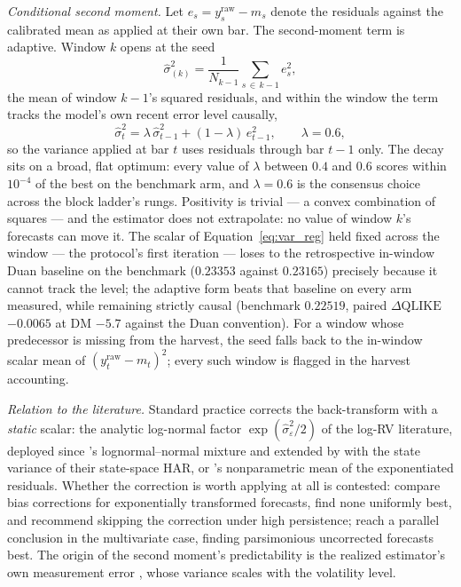 \emph{Conditional second moment.} Let
$e_s = y^{\mathrm{raw}}_s - m_s$ denote the residuals against the
calibrated mean as applied at their own bar. The second-moment term is
adaptive. Window $k$ opens at the seed
\begin{equation}
    \hat{\sigma}^2_{(k)}
    = \frac{1}{N_{k-1}} \sum_{s \,\in\, k-1} e_s^2,
    \label{eq:var_reg}
\end{equation}
the mean of window $k-1$'s squared residuals, and within the window the
term tracks the model's own recent error level causally,
\begin{equation}
    \hat{\sigma}^2_t
    = \lambda\, \hat{\sigma}^2_{t-1} + (1 - \lambda)\, e_{t-1}^2,
    \qquad \lambda = 0.6,
    \label{eq:var_ewma}
\end{equation}
so the variance applied at bar $t$ uses residuals through bar $t-1$
only. The decay sits on a broad, flat optimum: every value of $\lambda$
between $0.4$ and $0.6$ scores within $10^{-4}$ of the best on the
benchmark arm, and $\lambda = 0.6$ is the consensus choice across the
block ladder's rungs. Positivity is trivial --- a convex combination of
squares --- and the estimator does not extrapolate: no value of window
$k$'s forecasts can move it. The scalar of
Equation~\eqref{eq:var_reg} held fixed across the window --- the protocol's first iteration --- loses to the retrospective in-window Duan
baseline on the benchmark ($0.23353$ against $0.23165$) precisely
because it cannot track the level; the adaptive form beats that
baseline on every arm measured, while remaining strictly causal
(benchmark $0.22519$, paired $\Delta\mathrm{QLIKE}$ $-0.0065$ at DM
$-5.7$ against the Duan convention). For a window whose predecessor is
missing from the harvest, the seed falls back to the in-window scalar
mean of $(y^{\mathrm{raw}}_t - m_t)^2$; every such window is flagged in
the harvest accounting.

\emph{Relation to the literature.} Standard practice corrects the
back-transform with a \emph{static} scalar: the analytic log-normal
factor $\exp(\hat\sigma^2_\varepsilon / 2)$ of the log-RV literature,
deployed since \citet{AndersenBollerslevDieboldLabys2003}'s
lognormal--normal mixture and extended by \citet{BekiermanManner2018}
with the state variance of their state-space HAR, or
\citet{Duan1983}'s nonparametric mean of the exponentiated residuals.
Whether the correction is worth applying at all is contested:
\citet{DemetrescuGolosnoyTitova2020} compare bias corrections for
exponentially transformed forecasts, find none uniformly best, and
recommend skipping the correction under high persistence;
\citet{HalbleibVoev2011} reach a parallel conclusion in the
multivariate case, finding parsimonious uncorrected forecasts best.
The origin of the second moment's predictability is the realized
estimator's own measurement error
\citep{AsaiMcAleerMedeiros2012}, whose variance scales with the
volatility level.

